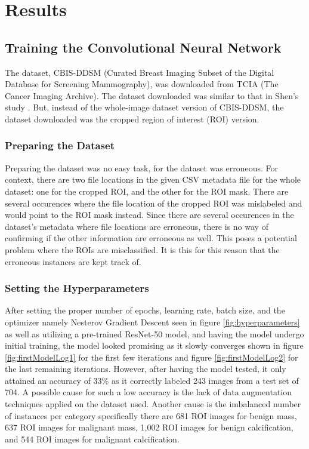\section{Results}

\subsection*{Training the Convolutional Neural Network}
\qquad The dataset, CBIS-DDSM (Curated Breast Imaging Subset of the Digital Database for Screening Mammography), was downloaded from TCIA (The Cancer Imaging Archive). The dataset downloaded was similar to that in Shen's study \cite{CNNmodel}. But, instead of the whole-image dataset version of CBIS-DDSM, the dataset downloaded was the cropped region of interest (ROI) version.

\subsubsection{Preparing the Dataset}
\qquad Preparing the dataset was no easy task, for the dataset was erroneous. For context, there are two file locations in the given CSV metadata file for the whole dataset: one for the cropped ROI, and the other for the ROI mask. There are several occurences where the file location of the cropped ROI was mislabeled and would point to the ROI mask instead. Since there are several occurences in the dataset's metadata where file locations are erroneous, there is no way of confirming if the other information are erroneous as well. This poses a potential problem where the ROIs are misclassified. It is this for this reason that the erroneous instances are kept track of.
	
\subsubsection{Setting the Hyperparameters}	
\qquad After setting the proper number of epochs, learning rate, batch size, and the optimizer namely Nesterov Gradient Descent seen in figure \ref{fig:hyperparameters} as well as utilizing a pre-trained ResNet-50 model, and having the model undergo initial training, the model looked promising as it slowly converges shown in figure \ref{fig:firstModelLog1} for the first few iterations and figure \ref{fig:firstModelLog2} for the last remaining iterations. However, after having the model tested, it only attained an accuracy of 33\% as it correctly labeled 243 images from a test set of 704. A possible cause for such a low accuracy is the lack of data augmentation techniques applied on the dataset used. Another cause is the imbalanced number of instances per category specifically there are 681 ROI images for benign mass, 637 ROI images for malignant mass, 1,002 ROI images for benign calcification, and 544 ROI images for malignant calcification.

